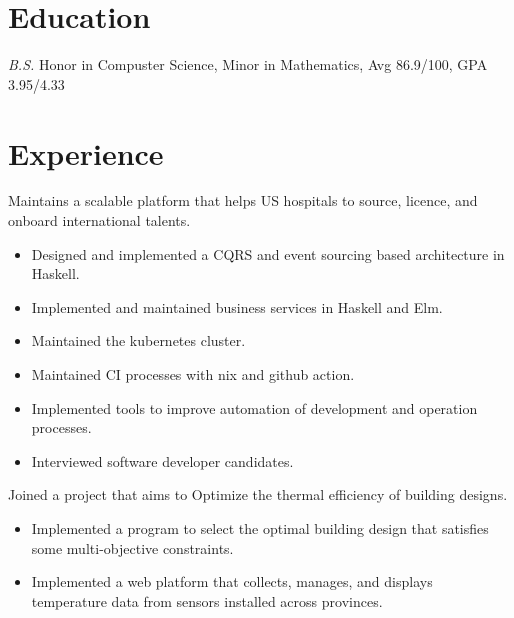 \documentclass{resume}
\begin{document}


\section{Education}
\textit{B.S.} Honor in Compuster Science, Minor in Mathematics, Avg 86.9/100, GPA 3.95/4.33

\section{Experience}
    Maintains a scalable platform that helps US hospitals to source, licence, and onboard international talents.

    \begin{itemize}
        \item Designed and implemented a CQRS and event sourcing based architecture in Haskell.

        \item Implemented and maintained business services in Haskell and Elm. 

        \item Maintained the kubernetes cluster.

        \item Maintained CI processes with nix and github action.

        \item Implemented tools to improve automation of development and operation processes. 

        \item Interviewed software developer candidates.
    \end{itemize}

     \vspace{-0.1in}

    Joined a project that aims to Optimize the thermal efficiency of building designs.

    \begin{itemize}
        \item Implemented a program to select the optimal building design that satisfies some multi-objective constraints.

        \item Implemented a web platform that collects, manages, and displays temperature data from sensors installed across provinces.
    \end{itemize}
\end{document}
